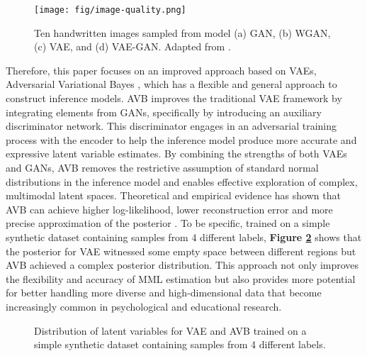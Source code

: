 \documentclass[a4paper,12pt]{article}
\theoremstyle{plain} %
\theoremstyle{remark} %
\theoremstyle{definition} %
\begin{document}
\begin{figure}[!htb]
    \centering
    \texttt{[image: fig/image-quality.png]}
    \caption{Ten handwritten images sampled from model (a) GAN, (b) WGAN, (c) VAE, and (d) VAE-GAN. Adapted from \cite{mi2018probe}.}
    \label{fig:image_quality}
\end{figure}

Therefore, this paper focuses on an improved approach based on VAEs, Adversarial Variational Bayes  \citep[AVB,][]{mescheder2017adversarial}, which has a flexible and general approach to construct inference models. AVB improves the traditional VAE framework by integrating elements from GANs, specifically by introducing an auxiliary discriminator network. This discriminator engages in an adversarial training process with the encoder to help the inference model produce more accurate and expressive latent variable estimates. By combining the strengths of both VAEs and GANs, AVB removes the restrictive assumption of standard normal distributions in the inference model and enables effective exploration of complex, multimodal latent spaces. Theoretical and empirical evidence has shown that AVB can achieve higher log-likelihood, lower reconstruction error and more precise approximation of the posterior \citep{mescheder2017adversarial}. To be specific, trained on a simple synthetic dataset containing samples from 4 different labels, \textbf{Figure \ref{fig:toy_comp}} shows that the posterior for VAE witnessed some empty space between different regions but AVB achieved a complex posterior distribution. This approach not only improves the flexibility and accuracy of MML estimation but also provides more potential for better handling more diverse and high-dimensional data that become increasingly common in psychological and educational research. 
\begin{figure}[!htb]
    \centering

    \caption{Distribution of latent variables for VAE and AVB trained on a simple synthetic dataset containing samples from 4 different labels.}
    \label{fig:toy_comp}
\end{figure}
\end{document}

